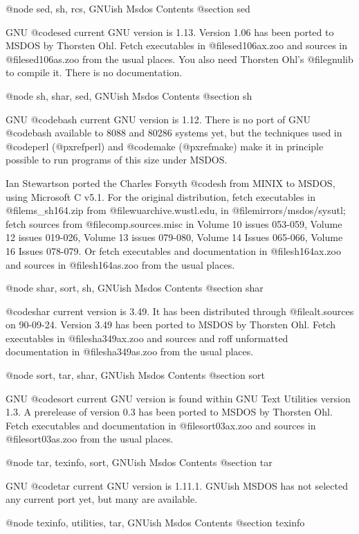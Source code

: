 @node sed, sh, rcs, GNUish Msdos Contents
@section sed

GNU @code{sed} current GNU version is 1.13.  Version 1.06 has been
ported to MSDOS by Thorsten Ohl.  Fetch executables in
@file{sed106ax.zoo} and sources in @file{sed106as.zoo} from the usual
places.  You also need Thorsten Ohl's @file{gnulib} to compile it.
There is no documentation.

@node sh, shar, sed, GNUish Msdos Contents
@section sh

GNU @code{bash} current GNU version is 1.12.  There is no port of GNU
@code{bash} available to 8088 and 80286 systems yet, but the techniques
used in @code{perl} (@pxref{perl}) and @code{make} (@pxref{make}) make
it in principle possible to run programs of this size under MSDOS.

Ian Stewartson ported the Charles Forsyth @code{sh} from MINIX to MSDOS,
using Microsoft C v5.1.  For the original distribution, fetch
executables in @file{ms_sh164.zip} from @file{wuarchive.wustl.edu}, in
@file{mirrors/msdos/sysutl}; fetch sources from @file{comp.sources.misc}
in Volume 10 issues 053-059, Volume 12 issues 019-026, Volume 13 issues
079-080, Volume 14 Issues 065-066, Volume 16 Issues 078-079.  Or fetch
executables and documentation in @file{sh164ax.zoo} and sources in
@file{sh164as.zoo} from the usual places.

@node shar, sort, sh, GNUish Msdos Contents
@section shar

@code{shar} current version is 3.49.  It has been distributed through
@file{alt.sources} on 90-09-24.  Version 3.49 has been ported to MSDOS
by Thorsten Ohl.  Fetch executables in @file{sha349ax.zoo} and sources
and roff unformatted documentation in @file{sha349as.zoo} from the usual
places.

@node sort, tar, shar, GNUish Msdos Contents
@section sort

GNU @code{sort} current GNU version is found within GNU Text Utilities
version 1.3.  A prerelease of version 0.3 has been ported to MSDOS by
Thorsten Ohl.  Fetch executables and documentation in
@file{sort03ax.zoo} and sources in @file{sort03as.zoo} from the usual
places.

@node tar, texinfo, sort, GNUish Msdos Contents
@section tar

GNU @code{tar} current GNU version is 1.11.1.  GNUish MSDOS has not
selected any current port yet, but many are available.

@node texinfo, utilities, tar, GNUish Msdos Contents
@section texinfo

